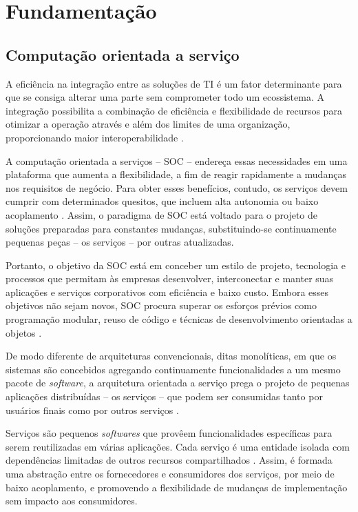 \section{Fundamentação}
\label{Fundamentacao}

\subsection{Computação orientada a serviço}

A eficiência na integração entre as soluções de TI é um fator determinante para
que se consiga alterar uma parte sem comprometer todo um ecossistema. A
integração possibilita a combinação de eficiência e flexibilidade de recursos para otimizar
a operação através e além dos limites de uma organização, proporcionando maior
interoperabilidade \cite{papazoglou2008service}.

A computação orientada a serviços -- SOC -- endereça essas necessidades em uma
plataforma que aumenta a flexibilidade, a
fim de reagir rapidamente a mudanças nos requisitos de negócio. Para obter esses
benefícios, contudo, os serviços devem cumprir com determinados quesitos, que
incluem alta autonomia ou baixo acoplamento \cite{erl2008soa}. Assim, o paradigma de SOC
está voltado para o projeto de soluções preparadas para constantes mudanças,
substituindo-se continuamente pequenas peças -- os serviços -- por outras
atualizadas.

Portanto, o objetivo da SOC está em conceber um estilo de projeto, tecnologia e
processos que permitam às empresas desenvolver, interconectar e manter suas
aplicações e serviços corporativos com eficiência e baixo custo. Embora esses
objetivos não sejam novos, SOC procura superar os esforços prévios como
programação modular, reuso de código e técnicas de desenvolvimento orientadas a
objetos \cite{papazoglou2007serviceApprTechRechIss}.

De modo diferente de arquiteturas convencionais, ditas monolíticas, em que os
sistemas são concebidos agregando continuamente funcionalidades a um mesmo pacote de
\textit{software}, a arquitetura orientada a serviço prega o projeto de pequenas
aplicações distribuídas -- os serviços -- que podem ser consumidas tanto por
usuários finais como por outros serviços \cite{papazoglou2007serviceApprTechRechIss}. 

Serviços são pequenos \textit{softwares} que provêem funcionalidades específicas
para serem reutilizadas em várias aplicações. Cada serviço é uma entidade isolada com
dependências limitadas de outros recursos compartilhados
\cite{serrano2014service}. Assim, é formada uma abstração entre os fornecedores
e consumidores dos serviços, por meio de baixo acoplamento, e promovendo a
flexibilidade de mudanças de implementação sem impacto aos consumidores.


